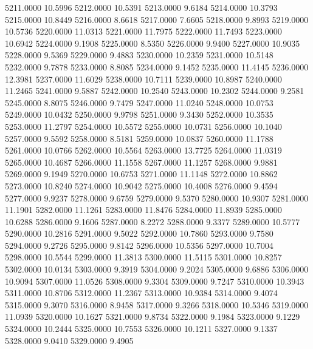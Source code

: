 5211.0000     10.5996
5212.0000     10.5391
5213.0000      9.6184
5214.0000     10.3793
5215.0000     10.8449
5216.0000      8.6618
5217.0000      7.6605
5218.0000      9.8993
5219.0000     10.5736
5220.0000     11.0313
5221.0000     11.7975
5222.0000     11.7493
5223.0000     10.6942
5224.0000      9.1908
5225.0000      8.5350
5226.0000      9.9400
5227.0000     10.9035
5228.0000      9.5369
5229.0000      9.4883
5230.0000     10.2359
5231.0000     10.5148
5232.0000      9.7878
5233.0000      8.8085
5234.0000      9.1452
5235.0000     11.4145
5236.0000     12.3981
5237.0000     11.6029
5238.0000     10.7111
5239.0000     10.8987
5240.0000     11.2465
5241.0000      9.5887
5242.0000     10.2540
5243.0000     10.2302
5244.0000      9.2581
5245.0000      8.8075
5246.0000      9.7479
5247.0000     11.0240
5248.0000     10.0753
5249.0000     10.0432
5250.0000      9.9798
5251.0000      9.3430
5252.0000     10.3535
5253.0000     11.2797
5254.0000     10.5572
5255.0000     10.0731
5256.0000     10.1040
5257.0000      9.5592
5258.0000      8.5181
5259.0000     10.0837
5260.0000     11.1788
5261.0000     10.0766
5262.0000     10.5564
5263.0000     13.7725
5264.0000     11.0319
5265.0000     10.4687
5266.0000     11.1558
5267.0000     11.1257
5268.0000      9.9881
5269.0000      9.1949
5270.0000     10.6753
5271.0000     11.1148
5272.0000     10.8862
5273.0000     10.8240
5274.0000     10.9042
5275.0000     10.4008
5276.0000      9.4594
5277.0000      9.9237
5278.0000      9.6759
5279.0000      9.5370
5280.0000     10.9307
5281.0000     11.1901
5282.0000     11.1261
5283.0000     11.8476
5284.0000     11.8939
5285.0000     10.6288
5286.0000      9.1606
5287.0000      8.2272
5288.0000      9.3377
5289.0000     10.5777
5290.0000     10.2816
5291.0000      9.5022
5292.0000     10.7860
5293.0000      9.7580
5294.0000      9.2726
5295.0000      9.8142
5296.0000     10.5356
5297.0000     10.7004
5298.0000     10.5544
5299.0000     11.3813
5300.0000     11.5115
5301.0000     10.8257
5302.0000     10.0134
5303.0000      9.3919
5304.0000      9.2024
5305.0000      9.6886
5306.0000     10.9094
5307.0000     11.0526
5308.0000      9.3304
5309.0000      9.7247
5310.0000     10.3943
5311.0000     10.8706
5312.0000     11.2367
5313.0000     10.9384
5314.0000      9.4074
5315.0000      9.3070
5316.0000      8.9458
5317.0000      9.3266
5318.0000     10.5346
5319.0000     11.0939
5320.0000     10.1627
5321.0000      9.8734
5322.0000      9.1984
5323.0000      9.1229
5324.0000     10.2444
5325.0000     10.7553
5326.0000     10.1211
5327.0000      9.1337
5328.0000      9.0410
5329.0000      9.4905
